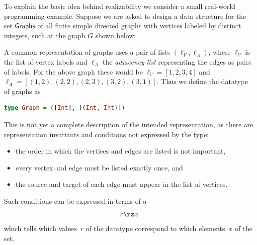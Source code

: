 To explain the basic idea behind realizability we consider a small real-world programming example. Suppose we are asked to design a data structure for the set $\mathsf{Graphs}$ of all finite simple directed graphs with vertices labeled by distinct integers, such at the graph $G$ shown below:
%
\begin{center}
\end{center}
%
A common representation of graphs uses a pair of lists $(\ell_V, \ell_A)$, where $\ell_V$ is the list of vertex labels and $\ell_A$ the \emph{adjacency list} representing the edges as pairs of labels. For the above graph these would be $\ell_V = [1, 2, 3, 4]$ and $\ell_A = [(1,2), (2,2), (2,3), (3,2), (3,1)]$.
%
Thus we define the datatype of graphs as
%
\begin{lstlisting}[language=Haskell]
type Graph = ([Int], [(Int, Int)])
\end{lstlisting}
%
This is not yet a complete description of the intended representation, as there are representation invariants and conditions not expressed by the type:
%
\begin{itemize}
\item the order in which the vertices and edges are listed is not
  important,
\item every vertex and edge must be listed exactly once, and
\item the source and target of each edge must appear in the list of vertices.
\end{itemize}
%
Such conditions can be expressed in terms of a 
\begin{equation*}
  r \rz x
\end{equation*}
%
which tells which values~$r$ of the datatype correspond to which elements~$x$ of the set.
